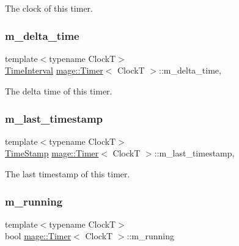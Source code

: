 The clock of this timer. \mbox{\label{classmage_1_1_timer_a9cb9bf6cd0f567a8a1fad02a89d98aa2}} 
\subsubsection{\texorpdfstring{m\+\_\+delta\+\_\+time}{m\_delta\_time}}
{\footnotesize\ttfamily template$<$typename ClockT$>$ \\
\mbox{\hyperlink{classmage_1_1_timer_a5c0fd78ceab0110637622bd0e9b8424d}{Time\+Interval}} \mbox{\hyperlink{classmage_1_1_timer}{mage\+::\+Timer}}$<$ ClockT $>$\+::m\+\_\+delta\+\_\+time\hspace{0.3cm}{\ttfamily [mutable]}, {\ttfamily [private]}}

The delta time of this timer. \mbox{\label{classmage_1_1_timer_a01e35b71a5fe5eebe3b05c1b675cb5ce}} 
\subsubsection{\texorpdfstring{m\+\_\+last\+\_\+timestamp}{m\_last\_timestamp}}
{\footnotesize\ttfamily template$<$typename ClockT$>$ \\
\mbox{\hyperlink{classmage_1_1_timer_abd11aea6107940b09ef3c48f62c81668}{Time\+Stamp}} \mbox{\hyperlink{classmage_1_1_timer}{mage\+::\+Timer}}$<$ ClockT $>$\+::m\+\_\+last\+\_\+timestamp\hspace{0.3cm}{\ttfamily [mutable]}, {\ttfamily [private]}}

The last timestamp of this timer. \mbox{\label{classmage_1_1_timer_a195789c583eb8bd3b9f0058214b74bc5}} 
\subsubsection{\texorpdfstring{m\+\_\+running}{m\_running}}
{\footnotesize\ttfamily template$<$typename ClockT$>$ \\
bool \mbox{\hyperlink{classmage_1_1_timer}{mage\+::\+Timer}}$<$ ClockT $>$\+::m\+\_\+running\hspace{0.3cm}{\ttfamily [private]}}

